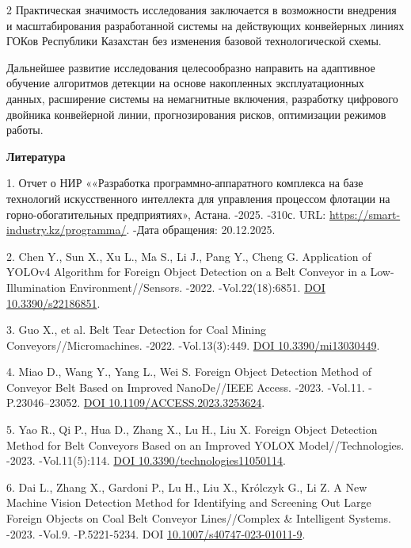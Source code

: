 \begin{multicols}{2}
Практическая значимость исследования заключается в возможности внедрения
и масштабирования разработанной системы на действующих конвейерных
линиях ГОКов Республики Казахстан без изменения базовой технологической
схемы.

Дальнейшее развитие исследования целесообразно направить на адаптивное
обучение алгоритмов детекции на основе накопленных эксплуатационных
данных, расширение системы на немагнитные включения, разработку
цифрового двойника конвейерной линии, прогнозирования рисков,
оптимизации режимов работы.
\end{multicols}

\begin{center}
{\bfseries Литература}
\end{center}

\begin{refs}
1. Отчет о НИР ««Разработка программно-аппаратного комплекса на базе
технологий искусственного интеллекта для управления процессом флотации
на горно-обогатительных предприятиях», Астана. -2025. -310с. URL:
\url{https://smart-industry.kz/programma/}. -Дата обращения:
20.12.2025.

2. Chen Y., Sun X., Xu L., Ma S., Li J., Pang Y., Cheng G. Application of
YOLOv4 Algorithm for Foreign Object Detection on a Belt Conveyor in a
Low-Illumination Environment//Sensors. -2022. -Vol.22(18):6851.
\href{https://doi.org/10.3390/s22186851}{DOI 10.3390/s22186851}.

3. Guo X., et al. Belt Tear Detection for Coal Mining
Conveyors//Micromachines. -2022. -Vol.13(3):449.
\href{https://doi.org/10.3390/mi13030449}{DOI 10.3390/mi13030449}.

4. Miao D., Wang Y., Yang L., Wei S. Foreign Object Detection Method of
Conveyor Belt Based on Improved NanoDe//IEEE Access. -2023. -Vol.11.
-P.23046--23052.
\href{https://doi.org/10.1109/ACCESS.2023.3253624}{DOI
10.1109/ACCESS.2023.3253624}.

5. Yao R., Qi P., Hua D., Zhang X., Lu H., Liu X. Foreign Object
Detection Method for Belt Conveyors Based on an Improved YOLOX
Model//Technologies. -2023. -Vol.11(5):114.
\href{https://doi.org/10.3390/technologies11050114}{DOI
10.3390/technologies11050114}.

6. Dai L., Zhang X., Gardoni P., Lu H., Liu X., Królczyk G., Li Z. A New
Machine Vision Detection Method for Identifying and Screening Out
Large Foreign Objects on Coal Belt Conveyor Lines//Complex \&
Intelligent Systems. -2023. -Vol.9. -P.5221-5234. DOI
\href{https://doi.org/10.1007/s40747-023-01011-9}{10.1007/s40747-023-01011-9}.


\end{refs}
